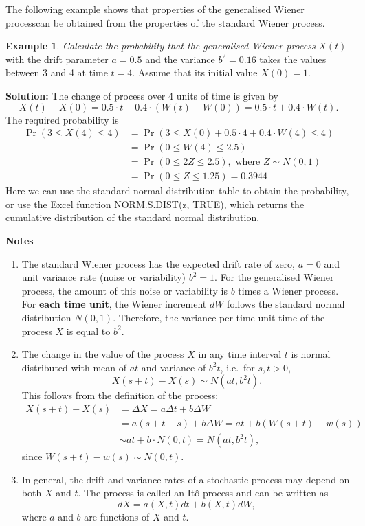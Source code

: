 \documentclass[
]{book}
\theoremstyle{definition}
\theoremstyle{definition}
\newtheorem{example}{Example}[chapter]
\theoremstyle{definition}
\theoremstyle{definition}
\theoremstyle{remark}
\begin{document}
The following example shows that properties of the generalised Wiener
processcan be obtained from the properties of the standard Wiener
process.

\begin{example}
\emph{Calculate the probability that the generalised Wiener process} \(X(t)\)
with the drift parameter \(a = 0.5\) and the variance \(b^2 = 0.16\) takes
the values between 3 and 4 at time \(t = 4\). Assume that its initial
value \(X(0) = 1\).
\end{example}

\textbf{Solution:} The change of process over 4 units of time is given by
\[X(t) - X(0) = 0.5 \cdot t + 0.4 \cdot (W(t) - W(0)) = 0.5 \cdot t + 0.4 \cdot W(t) .\]
The required probability is \[\begin{aligned}
        \Pr(3 \le X(4) \le 4) &= \Pr( 3 \le  X(0) + 0.5 \cdot 4 + 0.4 \cdot W(4)   \le 4  )\\
            &= \Pr(0 \le W(4) \le 2.5) \\
            &= \Pr(0 \le 2 Z \le 2.5), \text{ where }  Z \sim N(0,1) \\
            &= \Pr(0 \le Z \le 1.25) = 0.3944
    \end{aligned}\] Here we can use the standard normal distribution
table to obtain the probability, or use the Excel function
NORM.S.DIST(z, TRUE), which returns the cumulative distribution of the
standard normal distribution.

\textbf{Notes}

\begin{enumerate}
\def\labelenumi{\arabic{enumi}.}
\item
  The standard Wiener process has the expected drift rate of zero,
  \(a = 0\) and unit variance rate (noise or variability) \(b^2 = 1\). For
  the generalised Wiener process, the amount of this noise or
  variability is \(b\) times a Wiener process. For \textbf{each time unit},
  the Wiener increment \(dW\) follows the standard normal distribution
  \(N(0,1)\). Therefore, the variance per time unit time of the process
  \(X\) is equal to \(b^2\).
\item
  The change in the value of the process \(X\) in any time interval \(t\)
  is normal distributed with mean of \(at\) and variance of \(b^2 t\),
  i.e.~for \(s, t > 0\), \[X(s + t) - X(s) \sim N(at , b^2 t).\] This
  follows from the definition of the process: \[\begin{aligned}
    X(s + t) - X(s)   &= \Delta X  = a \Delta t + b \Delta W\\
                          &= a (s + t  - s) + b  \Delta W = a t + b (W(s + t) - w(s)) \\
                      &\sim at + b \cdot N(0, t) = N(at, b^2 t),\end{aligned}\]
  since \(W(s + t) - w(s) \sim N(0,t)\).
\item
  In general, the drift and variance rates of a stochastic process may
  depend on both \(X\) and \(t\). The process is called an Itô process and
  can be written as \[dX = a(X,t) dt + b(X,t) dW,\] where \(a\) and \(b\)
  are functions of \(X\) and \(t\).
\end{enumerate}
\end{document}
